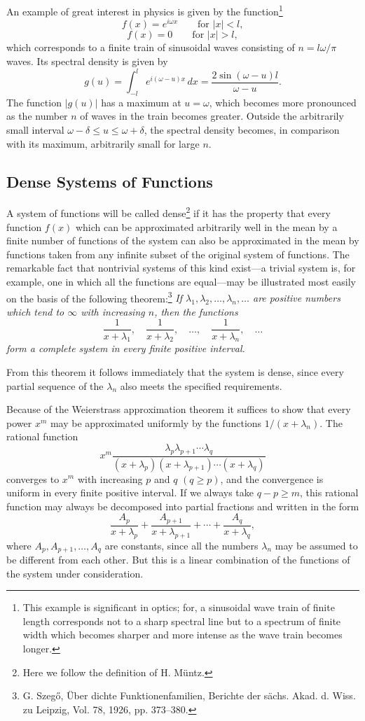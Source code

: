 An example of great interest in physics is given by the function\footnote{This example is significant in optics; for, a sinusoidal wave train of finite length corresponds not to a sharp spectral line but to a spectrum of finite width which becomes sharper and more intense as the wave train becomes longer.}
\[
f(x)=e^{i\omega x}\qquad\text{for }|x|<l,
\]
\[
f(x)=0\qquad\text{for }|x|>l,
\]
which corresponds to a finite train of sinusoidal waves consisting of $n=l\omega/\pi$ waves. Its spectral density is given by
\[
g(u)=\int_{-l}^{l}e^{i(\omega-u)x}\,dx
=\frac{2\sin(\omega-u)l}{\omega-u}.
\]
The function $|g(u)|$ has a maximum at $u=\omega$, which becomes more pronounced as the number $n$ of waves in the train becomes greater. Outside the arbitrarily small interval $\omega-\delta\le u\le\omega+\delta$, the spectral density becomes, in comparison with its maximum, arbitrarily small for large $n$.

\subsection{Dense Systems of Functions}
A system of functions will be called dense\footnote{Here we follow the definition of H. M\"untz.} if it has the property that every function $f(x)$ which can be approximated arbitrarily well in the mean by a finite number of functions of the system can also be approximated in the mean by functions taken from any infinite subset of the original system of functions. The remarkable fact that nontrivial systems of this kind exist---a trivial system is, for example, one in which all the functions are equal---may be illustrated most easily on the basis of the following theorem:\footnote{G. Szeg\H{o}, \"Uber dichte Funktionenfamilien, Berichte der s\"achs. Akad. d. Wiss. zu Leipzig, Vol. 78, 1926, pp. 373--380.} \emph{If $\lambda_1,\lambda_2,\ldots,\lambda_n,\ldots$ are positive numbers which tend to $\infty$ with increasing $n$, then the functions}
\[
\frac{1}{x+\lambda_1},\quad \frac{1}{x+\lambda_2},\quad\ldots,\quad\frac{1}{x+\lambda_n},\quad\ldots
\]
\emph{form a complete system in every finite positive interval.}

From this theorem it follows immediately that the system is dense, since every partial sequence of the $\lambda_n$ also meets the specified requirements.

Because of the Weierstrass approximation theorem it suffices to show that every power $x^m$ may be approximated uniformly by the functions $1/(x+\lambda_n)$. The rational function
\[
x^m\frac{\lambda_p\lambda_{p+1}\cdots\lambda_q}
{(x+\lambda_p)(x+\lambda_{p+1})\cdots(x+\lambda_q)}
\]
converges to $x^m$ with increasing $p$ and $q$ $(q\ge p)$, and the convergence is uniform in every finite positive interval. If we always take $q-p\ge m$, this rational function may always be decomposed into partial fractions and written in the form
\[
\frac{A_p}{x+\lambda_p}+\frac{A_{p+1}}{x+\lambda_{p+1}}+\cdots+\frac{A_q}{x+\lambda_q},
\]
where $A_p,A_{p+1},\ldots,A_q$ are constants, since all the numbers $\lambda_n$ may be assumed to be different from each other. But this is a linear combination of the functions of the system under consideration.


